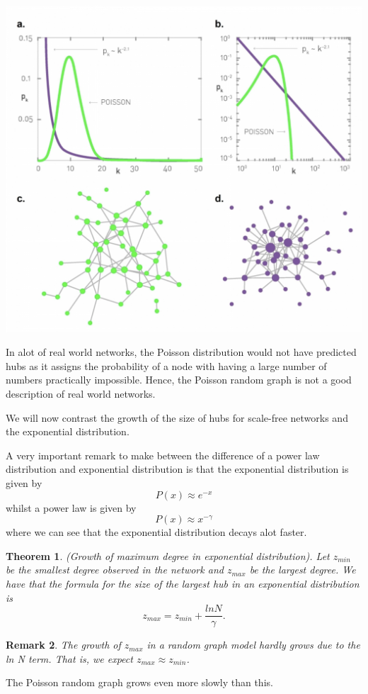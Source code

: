 \documentclass[twoside]{article}
\newcounter{lecnum}
\newtheorem{theorem}{Theorem}[lecnum]
\newtheorem{remark}[theorem]{Remark}
\begin{document}
\begin{center}
\includegraphics[scale=0.3]{Poisson-Scale-Free}
\end{center}

In alot of real world networks, the Poisson distribution would not have predicted hubs as it assigns the probability of a node with having a large number of numbers practically impossible. Hence, the Poisson random graph is not a good description of real world networks.

We will now contrast the growth of the size of hubs for scale-free networks and the exponential distribution.

A very important remark to make between the difference of a power law distribution and exponential distribution is that the exponential distribution is given by 
$$
P(x) \approx e^{-x}
$$
whilst a power law is given by 
$$
P(x) \approx x^{-\gamma}
$$
where we can see that the exponential distribution decays alot faster.

\begin{theorem}(Growth of maximum degree in exponential distribution). Let $z_{min}$ be the smallest degree observed in the network and $z_{max}$ be the largest degree. We have that the formula for the size of the largest hub in an exponential distribution is 
$$
z_{max} = z_{min} + \frac{ln N}{\gamma}.
$$
\end{theorem}

\begin{remark}The growth of $z_{max}$ in a random graph model hardly grows due to the ln N term. That is, we expect $z_{max} \approx z_{min}$.
\end{remark}
The Poisson random graph grows even more slowly than this.
\end{document}

